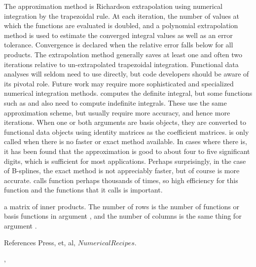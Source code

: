 \begin{Details}\relax
The approximation method is Richardson extrapolation using numerical
integration by the trapezoidal rule.  At each iteration, the number of
values at which the functions are evaluated is doubled, and a polynomial
extrapolation method is used to estimate the converged integral values
as well as an error tolerance.  Convergence is declared when the
relative error falls below  for all products.  The
extrapolation method generally saves at least one and often two
iterations relative to un-extrapolated trapezoidal integration.
Functional data analyses will seldom need to use 
directly, but code developers should be aware of its pivotal role.
Future work may require more sophisticated and specialized numerical
integration methods.
 computes the definite integral, but some functions
such as  and  also need to
compute indefinite integrals.  These use the same approximation scheme,
but usually require more accuracy, and hence more iterations.
When one or both arguments are basis objects, they are converted to
functional data objects using identity matrices as the coefficient
matrices.
 is only called when there is no faster or exact
method available.  In cases where there is, it has been found that the
approximation is good to about four to five significant digits, which is
sufficient for most applications.  Perhaps surprisingly, in the case of
B-splines, the exact method is not appreciably faster, but of course is
more accurate.
 calls function  perhaps thousands
of times, so high efficiency for this function and the functions that
it calls is important.
\end{Details}
\begin{Value}
a matrix of inner products.  The number of rows is the number of
functions or basis functions in argument , and the number of
columns is the same thing for argument .
\end{Value}
\begin{Section}{References}
Press, et, al, $Numerical Recipes$.
\end{Section}
\begin{SeeAlso}\relax
{},
\end{SeeAlso}

